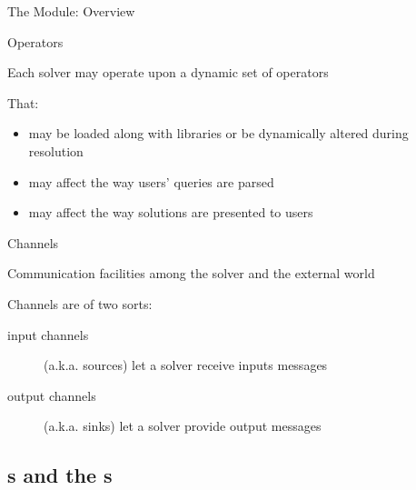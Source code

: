 \documentclass[handout]{beamer}
\begin{document}
\begin{frame}[allowframebreaks]{The  Module: Overview}
    \framebreak

    \begin{block}{Operators}
        \begin{center}
            Each solver may operate upon a dynamic set of operators
        \end{center}

        That:
        \begin{itemize}
            \item may be loaded along with libraries or be dynamically altered during resolution
            \item may affect the way users' queries are parsed
            \item may affect the way solutions are presented to users
        \end{itemize}
    \end{block}

    \framebreak

    \begin{block}{Channels}
        \begin{center}
            Communication facilities among the solver and the external world
        \end{center}

        Channels are of two sorts:
        \begin{description}
            \item[input channels] (a.k.a. \alert{sources}) let a solver receive inputs messages
            \item[output channels] (a.k.a. \alert{sinks}) let a solver provide output messages
        \end{description}
    \end{block}
\end{frame}

\subsection{s and the s}
\end{document}
